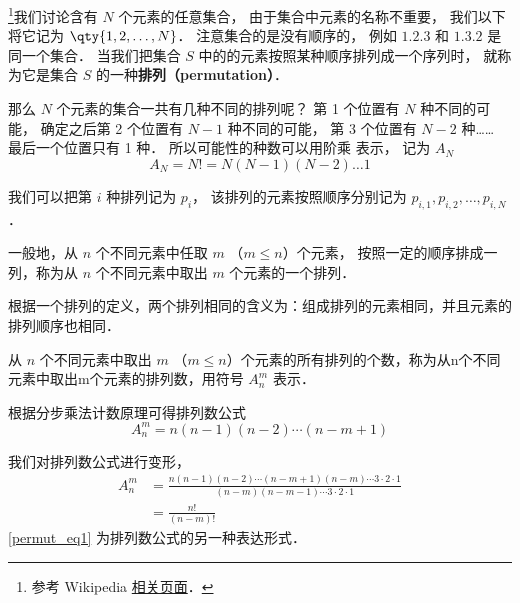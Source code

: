 


\footnote{参考 Wikipedia \href{https://en.wikipedia.org/wiki/Permutation}{相关页面}．}我们讨论含有 $N$ 个元素的任意集合， 由于集合中元素的名称不重要， 我们以下将它记为 $\qty{1,2,\dots, N}$． 注意集合的是没有顺序的， 例如 $\qty{1,2,3}$ 和 $\qty{1,3,2}$ 是同一个集合． 当我们把集合 $S$ 中的的元素按照某种顺序排列成一个序列时， 就称为它是集合 $S$ 的一种\textbf{排列（permutation）}．

那么 $N$ 个元素的集合一共有几种不同的排列呢？ 第 1 个位置有 $N$ 种不同的可能， 确定之后第 2 个位置有 $N-1$ 种不同的可能， 第 3 个位置有 $N-2$ 种…… 最后一个位置只有 1 种． 所以可能性的种数可以用阶乘 表示， 记为 $A_N$
\begin{equation}
A_N = N! = N(N-1)(N-2)\dots 1
\end{equation}

我们可以把第 $i$ 种排列记为 $p_i$， 该排列的元素按照顺序分别记为 $p_{i,1}, p_{i,2}, \dots, p_{i,N}$．

一般地，从 $n$ 个不同元素中任取 $m$ （$m \leq n$）个元素， 按照一定的顺序排成一列，称为从 $n$ 个不同元素中取出 $m$ 个元素的一个排列．

根据一个排列的定义，两个排列相同的含义为：组成排列的元素相同，并且元素的排列顺序也相同．

从 $n$ 个不同元素中取出 $m$ （$m \leq n$）个元素的所有排列的个数，称为从n个不同元素中取出m个元素的排列数，用符号 $A_n^m$ 表示．

根据分步乘法计数原理可得排列数公式\begin{equation}
A_n^m = n (n - 1)(n - 2) \cdots (n - m + 1)
\end{equation}

我们对排列数公式进行变形，\begin{equation}\label{permut_eq1}
\begin{aligned}
A_n^m &= \frac{n(n - 1)(n - 2)\cdots	(n - m + 1)(n - m)\cdots 3\cdot 2 \cdot 1}{(n - m)(n - m -1)\cdots 3\cdot 2 \cdot 1}\\
&=\frac{n!}{(n - m)!}
\end{aligned}
\end{equation}
\autoref{permut_eq1} 为排列数公式的另一种表达形式．
